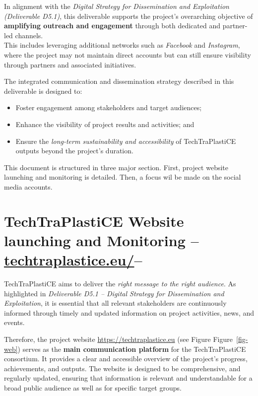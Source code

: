 \documentclass[
  12pt,
  oneside]{book}
\providecommand{\tightlist}{%
  \setlength{\itemsep}{0pt}\setlength{\parskip}{0pt}}
\begin{document}
In alignment with the \emph{Digital Strategy for Dissemination and
Exploitation (Deliverable D5.1)}, this deliverable supports the
project's overarching objective of \textbf{amplifying outreach and
engagement} through both dedicated and partner-led channels.\\
This includes leveraging additional networks such as \emph{Facebook} and
\emph{Instagram}, where the project may not maintain direct accounts but
can still ensure visibility through partners and associated initiatives.

The integrated communication and dissemination strategy described in
this deliverable is designed to:

\begin{itemize}
\tightlist
\item
  Foster engagement among stakeholders and target audiences;
\item
  Enhance the visibility of project results and activities; and
\item
  Ensure the \emph{long-term sustainability and accessibility} of
  TechTraPlastiCE outputs beyond the project's duration.
\end{itemize}

This document is structured in three major section. First, project
website launching and monitoring is detailed. Then, a focus wil be made
on the social media accounts.

\chapter{\texorpdfstring{TechTraPlastiCE Website launching and
Monitoring
--\href{https://techtraplastice.eu}{techtraplastice.eu/}--}{TechTraPlastiCE Website launching and Monitoring --techtraplastice.eu/--}}\label{techtraplastice-website-launching-and-monitoring-techtraplastice.eu}

TechTraPlastiCE aims to deliver the \emph{right message to the right
audience}. As highlighted in \emph{Deliverable D5.1 -- Digital Strategy
for Dissemination and Exploitation}, it is essential that all relevant
stakeholders are continuously informed through timely and updated
information on project activities, news, and events.

Therefore, the project website \url{https://techtraplastice.eu} (see
Figure Figure~\ref{fig-web}) serves as the \textbf{main communication
platform} for the TechTraPlastiCE consortium. It provides a clear and
accessible overview of the project's progress, achievements, and
outputs. The website is designed to be comprehensive, and regularly
updated, ensuring that information is relevant and understandable for a
broad public audience as well as for specific target groups.
\end{document}
